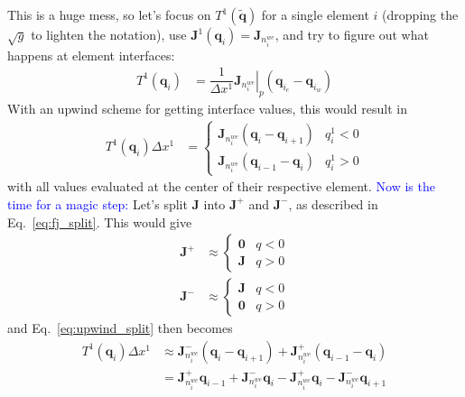 \documentclass[12pt]{article}
\newcommand{\todo}[1]{\textcolor{blue}{#1}}
\begin{document}
This is a huge mess, so let's focus on $T^1(\tilde{\bm{q}})$ for a single element $i$ (dropping the $\sqrt{g}$ to lighten the notation), use $\bm{J}^1(\bm{q}_i) = \bm{J}_{n^{we}_i}$, and try to figure out what happens at element interfaces:
\begin{align}
    T^1(\bm{q}_i) &=
        \dfrac{1}{\Delta x^1} \left. \bm{J}_{n^{we}_i} \right|_p \left( \bm{q}_{i_e} - \bm{q}_{i_w} \right)
\end{align}
With an upwind scheme for getting interface values, this would result in
\begin{align}\label{eq:upwind_split}
    T^1(\bm{q}_i) \Delta x^1 &= \left\{\begin{matrix}
        \bm{J}_{n^{we}_i} \left( \bm{q}_{i} - \bm{q}_{i+1} \right) & q^1_i < 0 \\
        \bm{J}_{n^{we}_i} \left( \bm{q}_{i-1} - \bm{q}_{i} \right) & q^1_i > 0 
    \end{matrix} \right.
\end{align}
with all values evaluated at the center of their respective element.
\todo{Now is the time for a magic step:} Let's split $\bm{J}$ into $\bm{J}^+$ and $\bm{J}^-$,
as described in Eq.~\ref{eq:fj_split}. This would give
\begin{align}
    \bm{J}^+ &\approx \left\{\begin{matrix}
        \bm{0} & q < 0 \\
        \bm{J} & q > 0
    \end{matrix}\right.
    \\
    \bm{J}^- &\approx \left\{\begin{matrix}
        \bm{J} & q < 0 \\
        \bm{0} & q > 0
    \end{matrix}\right.
\end{align}
and Eq.~\ref{eq:upwind_split} then becomes
\begin{align}
    T^1(\bm{q}_i) \Delta x^1
    &\approx
       \bm{J}^-_{n^{we}_i} \left( \bm{q}_{i} - \bm{q}_{i+1} \right) +
       \bm{J}^+_{n^{we}_i} \left( \bm{q}_{i-1} - \bm{q}_{i} \right)  \\
    &= \bm{J}^+_{n^{we}_i} \bm{q}_{i-1} + \bm{J}^-_{n^{we}_i} \bm{q}_i 
       - \bm{J}^+_{n^{we}_i} \bm{q}_i - \bm{J}^-_{n^{we}_i} \bm{q}_{i+1} \label{eq:psi_q_axis1}
\end{align}
\end{document}
